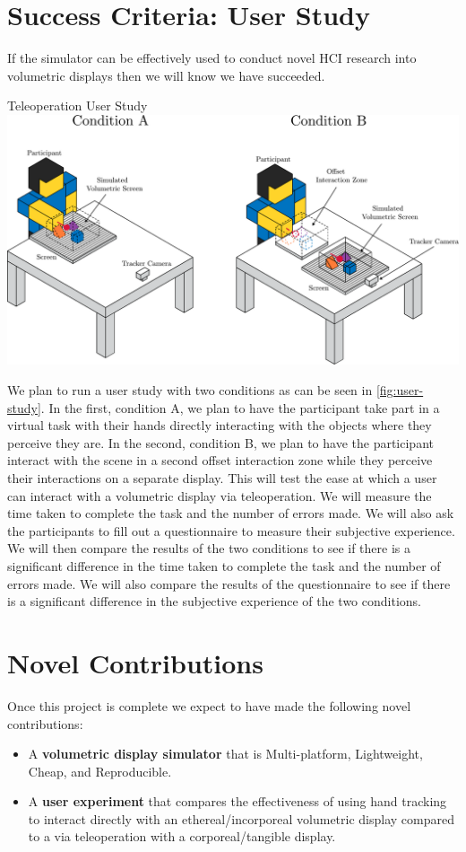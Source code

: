 \section{Success Criteria: User Study}
If the simulator can be effectively used to conduct novel HCI research into volumetric displays then we will know we have succeeded. 
\begin{figureBox}[label={fig:user-study}, width=\linewidth]{Teleoperation User Study}
    \includegraphics[width = 0.9\linewidth]{./evaluation plan/figures/user study.pdf}
\end{figureBox}
We plan to run a user study with two conditions as can be seen in \ref{fig:user-study}. In the first, condition A, we plan to have the participant take part in a virtual task with their hands directly interacting with the objects where they perceive they are. In the second, condition B, we plan to have the participant interact with the scene in a second offset interaction zone while they perceive their interactions on a separate display. This will test the ease at which a user can interact with a volumetric display via teleoperation. We will measure the time taken to complete the task and the number of errors made. We will also ask the participants to fill out a questionnaire to measure their subjective experience. We will then compare the results of the two conditions to see if there is a significant difference in the time taken to complete the task and the number of errors made. We will also compare the results of the questionnaire to see if there is a significant difference in the subjective experience of the two conditions.

\section{Novel Contributions}
Once this project is complete we expect to have made the following novel contributions:
\begin{itemize}
    \item A \textbf{volumetric display simulator} that is Multi-platform, Lightweight, Cheap, and Reproducible.
    \item A \textbf{user experiment} that compares the effectiveness of using hand tracking to interact directly with an ethereal/incorporeal volumetric display compared to a via teleoperation with a corporeal/tangible display.
\end{itemize}